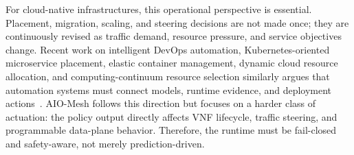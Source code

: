\documentclass[final,5p]{elsarticle}
\begin{document}
For cloud-native infrastructures, this operational perspective is essential. Placement, migration, scaling, and steering decisions are not made once; they are continuously revised as traffic demand, resource pressure, and service objectives change. Recent work on intelligent DevOps automation, Kubernetes-oriented microservice placement, elastic container management, dynamic cloud resource allocation, and computing-continuum resource selection similarly argues that automation systems must connect models, runtime evidence, and deployment actions~\cite{eramo2024architecture,ding2023kubernetes,mao2023flowcon,chen2023workloadwindows,chen2024crossedge,sedghani2024space4aid}. AIO-Mesh follows this direction but focuses on a harder class of actuation: the policy output directly affects VNF lifecycle, traffic steering, and programmable data-plane behavior. Therefore, the runtime must be fail-closed and safety-aware, not merely prediction-driven.
\end{document}
